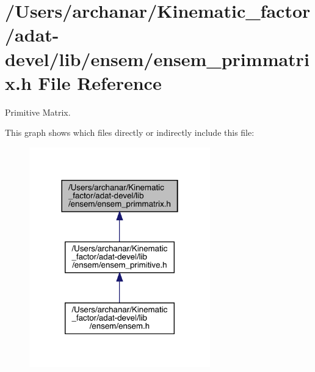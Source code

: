 \hypertarget{adat-devel_2lib_2ensem_2ensem__primmatrix_8h}{}\section{/\+Users/archanar/\+Kinematic\+\_\+factor/adat-\/devel/lib/ensem/ensem\+\_\+primmatrix.h File Reference}
\label{adat-devel_2lib_2ensem_2ensem__primmatrix_8h}


Primitive Matrix.  


This graph shows which files directly or indirectly include this file\+:
\nopagebreak
\begin{figure}[H]
\begin{center}
\leavevmode
\includegraphics[width=222pt]{d9/d58/adat-devel_2lib_2ensem_2ensem__primmatrix_8h__dep__incl}
\end{center}
\end{figure}
